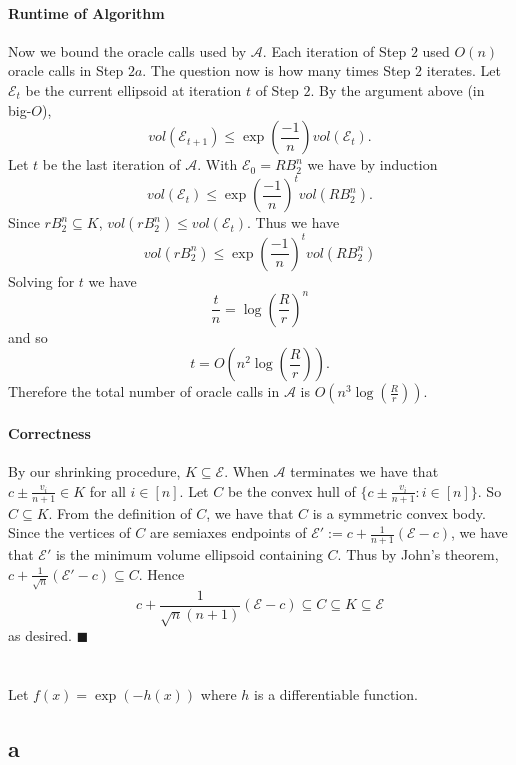\documentclass[letterpaper,12pt,oneside,onecolumn]{article}
\newcommand{\cA}{\mathcal{A}} \newcommand{\cB}{\mathcal{B}}
\newcommand{\cE}{\mathcal{E}} \newcommand{\cF}{\mathcal{F}}
\begin{document}
\paragraph{Runtime of Algorithm}
Now we bound the oracle calls used by $\cA$. Each iteration of Step $2$ used $O(n)$ oracle calls in Step $2a$. The question now is how many times Step $2$ iterates. Let $\cE_t$ be the current ellipsoid at iteration $t$ of Step $2$. By the argument above (in big-$O$),
$$vol(\cE_{t+1}) \leq \exp(\frac{-1}{n}) vol(\cE_t).$$
Let $t$ be the last iteration of $\cA$. With $\cE_0 = RB^n_2$ we have by induction
$$vol(\cE_t) \leq \exp(\frac{-1}{n})^t vol(RB^n_2).
$$Since $rB^n_2 \subseteq K$, $vol(rB^n_2) \leq vol(\cE_t)$. Thus we have
$$vol(rB^n_2) \leq \exp(\frac{-1}{n})^t vol(RB^n_2)$$
Solving for $t$ we have
$$\frac{t}{n} = \log(\frac{R}{r})^n$$
and so 
$$t = O(n^2\log(\frac{R}{r})).$$
Therefore the total number of oracle calls in $\cA$ is $O(n^3\log(\frac{R}{r}))$.
\paragraph{Correctness}
By our shrinking procedure, $K \subseteq \cE$. When $\cA$ terminates we have that
$c\pm \frac{v_i}{n+1} \in K$ for all $i \in [n]$. Let $C$ be the convex hull of $\{c\pm \frac{v_i}{n+1} : i \in [n]\}$. So $C \subseteq K$. From the definition of $C$, we have that $C$ is a symmetric convex body. Since the vertices of $C$ are semiaxes endpoints of $\cE' := c + \frac{1}{n+1}(\cE - c)$, we have that $\cE'$ is the minimum volume ellipsoid containing $C$. Thus by John's theorem, $c + \frac{1}{\sqrt{n}}(\cE'-c) \subseteq C$. Hence 
$$c + \frac{1}{\sqrt{n}(n+1)}(\cE  - c) \subseteq C \subseteq K \subseteq \cE$$
as desired. $\blacksquare$
\section{}

\section{}
\paragraph{}
Let $f(x) = \exp(-h(x))$ where $h$ is a differentiable function.
\subsection{a}
\end{document}

